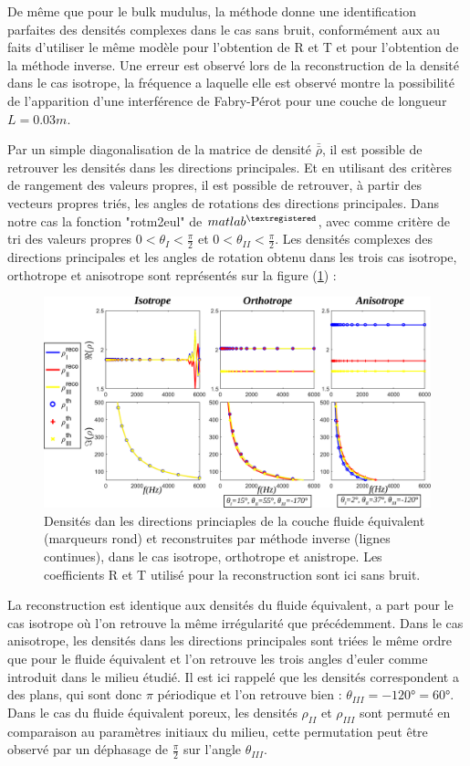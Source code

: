 \documentclass[12pt]{report}
\begin{document}
    De même que pour le bulk mudulus, la méthode donne une identification parfaites des densités complexes dans le cas sans bruit, conformément aux au faits d'utiliser le même modèle pour l'obtention de R et T et pour l'obtention de la méthode inverse. Une erreur est observé lors de la reconstruction de la densité dans le cas isotrope, la fréquence a laquelle elle est observé montre la possibilité de l'apparition d'une interférence de Fabry-Pérot pour une couche de longueur $L=0.03m$.
    
    Par un simple diagonalisation de la matrice de densité $\bar{\bar{\rho}}$, il est possible de retrouver les densités dans les directions principales. Et en utilisant des critères de rangement des valeurs propres, il est possible de retrouver, à partir des vecteurs propres triés, les angles de rotations des directions principales. Dans notre cas la fonction "rotm2eul" de $matlab^{\textregistered}$, avec comme critère de tri des valeurs propres $0<\theta_{I}<\frac{\pi}{2}$ et $0<\theta_{II}<\frac{\pi}{2}$.
    Les densités complexes des directions principales et les angles de rotation obtenu dans les trois cas isotrope, orthotrope et anisotrope sont représentés sur la figure (\ref{rho_dir}) : 
    \begin{figure}[ht!]
        \centering
        \includegraphics[scale=0.45]{Density_dir.pdf}
        \caption{Densités dan les directions princiaples de la couche fluide équivalent (marqueurs rond) et reconstruites par méthode inverse  (lignes continues), dans le cas isotrope, orthotrope et anistrope. Les coefficients R et T utilisé pour la reconstruction sont ici sans bruit.}
        \label{rho_dir}
    \end{figure}
    
    La reconstruction est identique aux densités du fluide équivalent, a part pour le cas isotrope où l'on retrouve la même irrégularité que précédemment. Dans le cas anisotrope, les densités dans les directions principales sont triées le même ordre que pour le fluide équivalent et l'on retrouve les trois angles d'euler comme introduit dans le milieu étudié. Il est ici rappelé que les densités correspondent a des plans, qui sont donc $\pi$ périodique et l'on retrouve bien : $\theta_{III}=-120°=60°$. Dans le cas du fluide équivalent poreux, les densités $\rho_{II}$ et $\rho_{III}$ sont permuté en comparaison au paramètres initiaux du milieu, cette permutation peut être observé par un déphasage de $\frac{\pi}{2}$ sur l'angle $\theta_{III}$.
    
\end{document}

